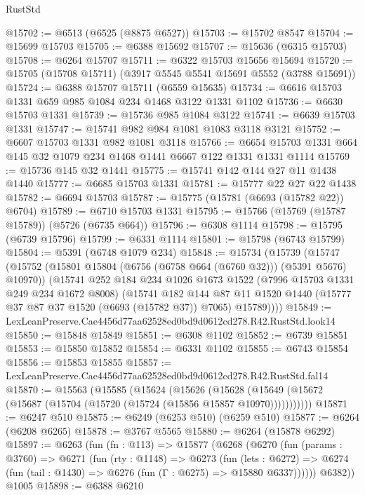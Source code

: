 \begin{lexlean}{RustStd}
\begin{coremodule}
@15702 := @6513 (@6525 (@8875 @6527))
@15703 := @15702 @8547
@15704 := @15699 @15703
@15705 := @6388 @15692
@15707 := @15636 (@6315 @15703)
@15708 := @6264 @15707
@15711 := @6322 @15703 @15656 @15694
@15720 := @15705 (@15708 @15711) (@3917 @5545 @5541 @15691 @5552 (@3788 @15691))
@15724 := @6388 @15707 @15711 (@6559 @15635)
@15734 := @6616 @15703 @1331 @659 @985 @1084 @234 @1468 @3122 @1331 @1102
@15736 := @6630 @15703 @1331
@15739 := @15736 @985 @1084 @3122
@15741 := @6639 @15703 @1331
@15747 := @15741 @982 @984 @1081 @1083 @3118 @3121
@15752 := @6607 @15703 @1331 @982 @1081 @3118
@15766 := @6654 @15703 @1331 @664 @145 @32 @1079 @234 @1468 @1441 @6667 @122 @1331 @1331 @1114
@15769 := @15736 @145 @32 @1441
@15775 := @15741 @142 @144 @27 @11 @1438 @1440
@15777 := @6685 @15703 @1331
@15781 := @15777 @22 @27 @22 @1438
@15782 := @6694 @15703
@15787 := @15775 (@15781 (@6693 (@15782 @22)) @6704)
@15789 := @6710 @15703 @1331
@15795 := @15766 (@15769 (@15787 @15789)) (@5726 (@6735 @664))
@15796 := @6308 @1114
@15798 := @15795 (@6739 @15796)
@15799 := @6331 @1114
@15801 := @15798 (@6743 @15799)
@15804 := @5391 (@6748 @1079 @234)
@15848 := @15734
    (@15739
      (@15747
        (@15752 (@15801 @15804 (@6756 (@6758 @664 (@6760 @32))) (@5391 @5676) @10970))
        (@15741
          @252
          @184
          @234
          @1026
          @1673
          @1522
          (@7996 @15703 @1331 @249 @234 @1672 @8008)
          (@15741
            @182
            @144
            @87
            @11
            @1520
            @1440
            (@15777 @37 @87 @37 @1520 (@6693 (@15782 @37)) @7065)
            @15789))))
@15849 := LexLeanPreserve.Cae4456d77aa62528ed0bd9d0612cd278.R42.RustStd.look14
@15850 := @15848 @15849
@15851 := @6308 @1102
@15852 := @6739 @15851
@15853 := @15850 @15852
@15854 := @6331 @1102
@15855 := @6743 @15854
@15856 := @15853 @15855
@15857 := LexLeanPreserve.Cae4456d77aa62528ed0bd9d0612cd278.R42.RustStd.fal14
@15870 := @15563
    (@15585
      (@15624
        (@15626
          (@15628 (@15649 (@15672 (@15687 (@15704 (@15720 (@15724 (@15856 @15857 @10970)))))))))))
@15871 := @6247 @510
@15875 := @6249 (@6253 @510) (@6259 @510)
@15877 := @6264 (@6208 @6265)
@15878 := @3767 @5565
@15880 := @6264 (@15878 @6292)
@15897 := @6263
    (fun (fn : @113) =>
    @15877
      (@6268
        (@6270
          (fun (params : @3760) =>
          @6271
            (fun (rty : @1148) =>
            @6273
              (fun (lets : @6272) =>
              @6274 (fun (tail : @1430) => @6276 (fun (Γ : @6275) => @15880 @6337))))))
        @6382))
    @1005
@15898 := @6388 @6210

\end{coremodule}
\end{lexlean}
